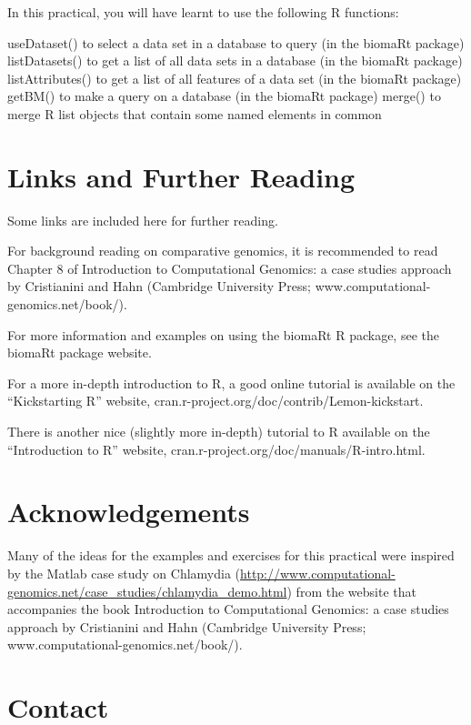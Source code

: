 \documentclass[
]{book}
\begin{document}
In this practical, you will have learnt to use the following R functions:

useDataset() to select a data set in a database to query (in the biomaRt package)
listDatasets() to get a list of all data sets in a database (in the biomaRt package)
listAttributes() to get a list of all features of a data set (in the biomaRt package)
getBM() to make a query on a database (in the biomaRt package)
merge() to merge R list objects that contain some named elements in common

\hypertarget{links-and-further-reading-1}{%
\chapter{Links and Further Reading}\label{links-and-further-reading-1}}

Some links are included here for further reading.

For background reading on comparative genomics, it is recommended to read Chapter 8 of Introduction to Computational Genomics: a case studies approach by Cristianini and Hahn (Cambridge University Press; www.computational-genomics.net/book/).

For more information and examples on using the biomaRt R package, see the biomaRt package website.

For a more in-depth introduction to R, a good online tutorial is available on the ``Kickstarting R'' website, cran.r-project.org/doc/contrib/Lemon-kickstart.

There is another nice (slightly more in-depth) tutorial to R available on the ``Introduction to R'' website, cran.r-project.org/doc/manuals/R-intro.html.

\hypertarget{acknowledgements-3}{%
\chapter{Acknowledgements}\label{acknowledgements-3}}

Many of the ideas for the examples and exercises for this practical were inspired by the Matlab case study on Chlamydia (\url{http://www.computational-genomics.net/case_studies/chlamydia_demo.html}) from the website that accompanies the book Introduction to Computational Genomics: a case studies approach by Cristianini and Hahn (Cambridge University Press; www.computational-genomics.net/book/).

\hypertarget{contact}{%
\chapter{Contact}\label{contact}}
\end{document}
